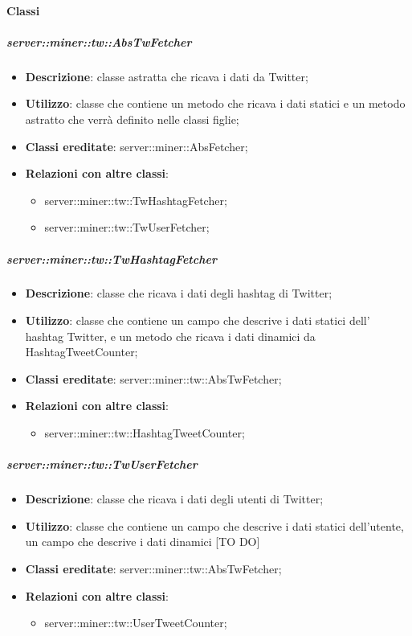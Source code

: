 	\paragraph{Classi} %
	\subparagraph{server::miner::tw::AbsTwFetcher} %
		\label{subp:server_miner_tw_AbsTwFetcher}
			\begin{itemize}
				\item \textbf{Descrizione}: classe astratta che ricava i dati da Twitter;
				\item \textbf{Utilizzo}: classe che contiene un metodo che ricava i dati statici e un metodo
astratto che verrà definito nelle classi figlie;
				\item \textbf{Classi ereditate}: server::miner::AbsFetcher;
				\item \textbf{Relazioni con altre classi}:
					\begin{itemize}
						\item server::miner::tw::TwHashtagFetcher;
						\item server::miner::tw::TwUserFetcher;
					\end{itemize}
			\end{itemize}
		
	\subparagraph{server::miner::tw::TwHashtagFetcher} %
		\label{subp:server_miner_tw_TwHashtagFetcher}
			\begin{itemize}
				\item \textbf{Descrizione}: classe che ricava i dati degli hashtag di Twitter;
				\item \textbf{Utilizzo}: classe che contiene un campo che descrive i dati statici dell' hashtag Twitter, e un metodo che ricava i dati dinamici da HashtagTweetCounter;
				\item \textbf{Classi ereditate}: server::miner::tw::AbsTwFetcher;
				\item \textbf{Relazioni con altre classi}: 
					\begin{itemize}
						\item server::miner::tw::HashtagTweetCounter;
					\end{itemize}
			\end{itemize}
		
	\subparagraph{server::miner::tw::TwUserFetcher} %
		\label{subp:server_miner_tw_TwUserFetcher}
			\begin{itemize}
				\item \textbf{Descrizione}: classe che ricava i dati degli utenti di Twitter;
				\item \textbf{Utilizzo}: classe che contiene un campo che descrive i dati statici dell'utente, un campo che descrive i dati dinamici [TO DO]
				\item \textbf{Classi ereditate}: server::miner::tw::AbsTwFetcher;				
				\item \textbf{Relazioni con altre classi}:
					\begin{itemize}
						\item server::miner::tw::UserTweetCounter;
					\end{itemize}
			\end{itemize}
		
